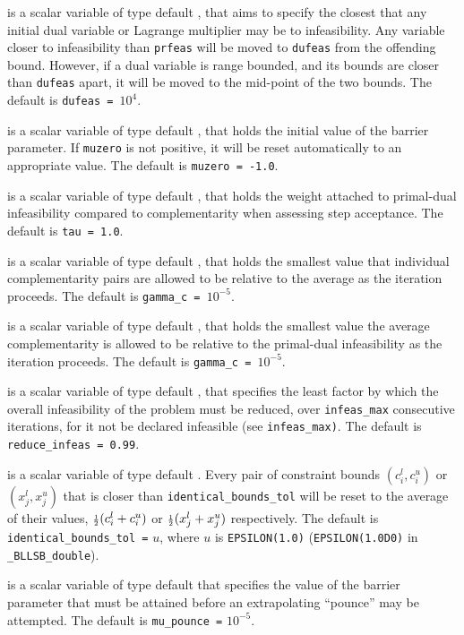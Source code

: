 \documentclass{galahad}
\newcommand{\packagename}{BLLSB}
\newcommand{\fullpackagename}{\libraryname\_\packagename}
\begin{document}
\begin{description}
 is a scalar variable of type default \realdp, that aims to specify
the closest that any initial dual variable or Lagrange multiplier may be to
infeasibility. Any variable closer to infeasibility than {\tt prfeas} will be
moved to {\tt dufeas} from the offending bound. However, if a dual variable
is range bounded, and its bounds are closer than {\tt dufeas} apart, it will
be moved to the mid-point of the two bounds.
The default is {\tt dufeas = $10^4$}.

  is a scalar variable of type default \realdp, that holds the
initial value of the barrier parameter. If {\tt muzero} is
not positive, it will be reset automatically to an appropriate value.
The default is {\tt muzero = -1.0}.

  is a scalar variable of type default \realdp, that holds the
weight attached to primal-dual infeasibility compared to complementarity
when assessing step acceptance.
The default is {\tt tau = 1.0}.

  is a scalar variable of type default \realdp, that holds the
smallest value that individual complementarity pairs are allowed
to be relative to the average as the iteration proceeds.
The default is {\tt gamma\_c = $10^{-5}$}.

  is a scalar variable of type default \realdp, that holds the
smallest value the average complementarity is allowed
to be relative to the primal-dual infeasibility as the iteration proceeds.
The default is {\tt gamma\_c = $10^{-5}$}.

  is a scalar variable of type default
\realdp, that specifies the
least factor by which the overall infeasibility of the problem must be reduced,
over {\tt infeas\_max} consecutive iterations,
for it not be declared infeasible (see {\tt infeas\_max)}.
The default is {\tt reduce\_infeas = 0.99}.

is a scalar variable of type default \realdp.
Every pair of constraint bounds
$(c_{i}^{l}, c_{i}^{u})$ or $(x_{j}^{l}, x_{j}^{u})$
that is closer than {\tt identical\_bounds\_tol}
will be reset to the average of their values,
${\scriptstyle \frac{1}{2}} (c_{i}^{l} + c_{i}^{u})$ or ${\scriptstyle \frac{1}{2}} (x_{j}^{l} + x_{j}^{u})$
respectively.
The default is {\tt identical\_bounds\_tol =} $u$,
where $u$ is {\tt EPSILON(1.0)} ({\tt EPSILON(1.0D0)} in
{\tt \fullpackagename\_double}).

is a scalar variable of type default \realdp that specifies
the value of the barrier parameter that must be attained before an 
extrapolating ``pounce'' may be attempted.
The default is {\tt mu\_pounce =} $10^{-5}$.


\end{description}
\end{document}
